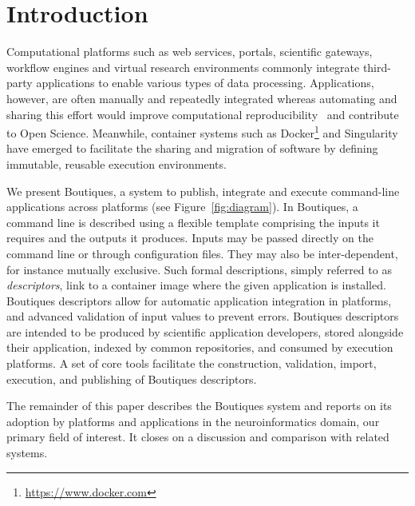 \documentclass[a4paper,num-refs]{oup-contemporary}
\newcommand{\boutiques}{Boutiques\xspace}
\begin{document}
\section{Introduction}

Computational platforms such as web services, portals, scientific
gateways, workflow engines and virtual research environments commonly
integrate third-party applications to enable various types of data
processing. Applications, however, are often manually and
repeatedly integrated whereas automating and
sharing this effort would improve computational
reproducibility~\cite{peng2011reproducible,Stodden1240} and contribute
to Open Science. Meanwhile, container systems such as
Docker\footnote{\url{https://www.docker.com}} and
Singularity~\cite{kurtzer2017singularity} have emerged to facilitate
the sharing and migration of software by defining immutable, reusable
execution environments.

We present \boutiques, a system to publish, integrate and execute
command-line applications across platforms (see
Figure~\ref{fig:diagram}).  In \boutiques, a command line is described
using a flexible template comprising the inputs it requires and the
outputs it produces. Inputs may be passed directly on the command line
or through configuration files. They may also be inter-dependent, for
instance mutually exclusive. Such formal descriptions, simply referred
to as \emph{descriptors}, link to a container image where the given
application is installed. \boutiques descriptors allow for automatic
application integration in platforms, and advanced validation of input
values to prevent errors.  \boutiques descriptors are intended to be
produced by scientific application developers, stored alongside their
application, indexed by common repositories, and consumed by execution
platforms.  A set of core tools facilitate the construction,
validation, import, execution, and publishing of \boutiques
descriptors.

The remainder of this paper describes the \boutiques system
and reports on its adoption by platforms
and applications in the neuroinformatics domain, our primary field of
interest. It closes on a discussion and
comparison with related systems.
\end{document}

